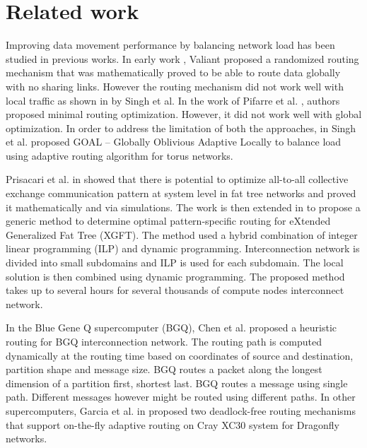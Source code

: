 \section{Related work}
\label{sec:relatedwork}

Improving data movement performance by balancing network load has been studied in previous works. In early work \cite{Valiant81:Routing}, Valiant proposed a randomized routing mechanism that was mathematically proved to be able to route data globally with no sharing links. However the routing mechanism did not work well with local traffic as shown in \cite{singh2003:GOAL} by Singh et al. In the work of Pifarre et al. \cite{Pifarre91}, authors proposed minimal routing optimization. However, it did not work well with global optimization. In order to address the limitation of both the approaches, in \cite{singh2003:GOAL} Singh et al. proposed GOAL -- Globally Oblivious Adaptive Locally to balance load using adaptive routing algorithm for torus networks. %

Prisacari et al. in \cite{Prisacari13a} showed that there is potential to optimize all-to-all collective exchange communication pattern at system level in fat tree networks and proved it mathematically and via simulations. The work is then extended in \cite{Prisacari13b} to propose a generic method to determine optimal pattern-specific routing for eXtended Generalized Fat Tree (XGFT). The method used a hybrid combination of integer linear programming (ILP) and dynamic programming. Interconnection network is divided into small subdomains and ILP is used for each subdomain. The local solution is then combined using dynamic programming. The proposed method takes up to several hours for several thousands of compute nodes interconnect network.

In the Blue Gene Q supercomputer (BGQ), Chen et al. \cite{Chen:BGQ} proposed a heuristic routing for BGQ interconnection network. The routing path is computed dynamically at the routing time based on coordinates of source and destination, partition shape and message size. BGQ routes a packet along the longest dimension of a partition first, shortest last. BGQ routes a message using single path. Different messages however might be routed using different paths. In other supercomputers, Garcia et al. in \cite{garcia2013:CrayDragonfly} proposed two deadlock-free routing mechanisms that support on-the-fly adaptive routing on Cray XC30 system for Dragonfly networks.


